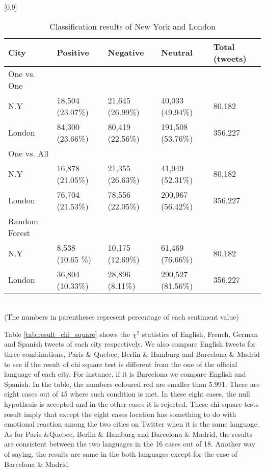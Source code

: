 \documentclass[twocolumn]{article}
\begin{document}
\begin{table}[ht]
	\caption{Classification results of New York and London}
	\scalebox{0.8}[0.9]{
	\begin{tabular}{|l|p{1.5cm}|p{1.5cm}|p{1.5cm}|p{1.5cm}|} \hline
	City&Positive&Negative&Neutral&Total (tweets)\\ \hline \hline
	One vs. One& {} & {} & {} & {}\\ 
	N.Y  & 18,504 (23.07\%) & 21,645 (26.99\%)  & 40,033 (49.94\%) & 80,182\\
	London & 84,300 (23.66\%)& 80,419 (22.56\%)& 191,508 (53.76\%)& 356,227\\ \hline
	One vs. All& {} & {} & {} & {}\\ 
	N.Y  & 16,878 (21.05\%)& 21,355 (26.63\%)& 41,949 (52.31\%)& 80,182\\
	London & 76,704 (21.53\%)& 78,556 (22.05\%)& 200,967 (56.42\%)& 356,227\\ \hline
	Random Forest& {} & {} & {} & {}\\ 
	N.Y  & 8,538 (10.65 \%)& 10,175 (12.69\%)& 61,469 (76.66\%)& 80,182\\ 
	London & 36,804 (10.33\%)& 28,896 (8.11\%)& 290,527 (81.56\%)& 356,227\\ \hline

	\end{tabular}
	}
	\label{tab:result_ny_london}
	\\(The numbers in parentheses represent percentage of each sentiment value)
\end{table}

Table \ref{tab:result_chi_square} shows the $\chi^2$ statistics of English, French, German and Spanish tweets of each city respectively.
We also compare English tweets for three combinations, Paris \& Quebec, Berlin \& Hamburg and Barcelona \& Madrid to see if the result of chi square test is different from the one of the official language of each city.
For instance, if it is Barcelona we compare English and Spanish.
In the table, the numbers coloured red are smaller than 5.991.
There are eight cases out of 45 where such condition is met.
In these eight cases, the null hypothesis is accepted and in the other cases it is rejected.
These chi square tests result imply that except the eight cases location has something to do with emotional reaction among the two cities on Twitter when it is the same language. 
As for Paris \&Quebec, Berlin \& Hamburg and Barcelona \& Madrid, the results are consistent between the two languages in the 16 cases out of 18.
Another way of saying, the results are same in the both languages except for the case of Barcelona \& Madrid.
\end{document}
